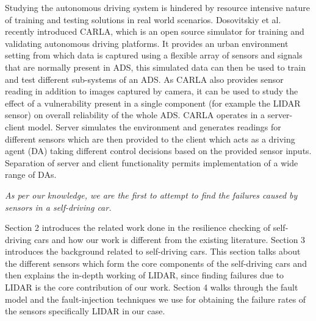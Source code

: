 Studying the autonomous driving system is hindered by resource intensive nature of training and testing solutions in real world scenarios. Dosovitskiy et al.~\cite{Dosovitskiy17} recently introduced CARLA, which is an open source simulator for training and validating autonomous driving platforms. It provides an urban environment setting from which data is captured using a flexible array of sensors and signals that are normally present in ADS, this simulated data can then be used to train and test different sub-systems of an ADS. As CARLA also provides sensor reading in addition to images captured by camera, it can be used to study the effect of a vulnerability present in a single component (for example the LIDAR sensor) on overall reliability of the whole ADS. CARLA operates in a server-client model. Server simulates the environment and generates readings for different sensors which are then provided to the client which acts as a driving agent (DA) taking different control decisions based on the provided sensor inputs. Separation of server and client functionality permits implementation of a wide range of DAs.

\emph{As per our knowledge, we are the first to attempt to find the failures caused by sensors in a self-driving car.}

Section 2 introduces the related work done in the resilience checking of self-driving cars and how our work is different from the existing literature. Section 3 introduces the background related to self-driving cars. This section talks about the different sensors which form the core components of the self-driving cars and then explains the in-depth working of LIDAR, since finding failures due to LIDAR is the core contribution of our work.  Section 4 walks through the fault model and the fault-injection techniques we use for obtaining the failure rates of the sensors specifically LIDAR in our case. 